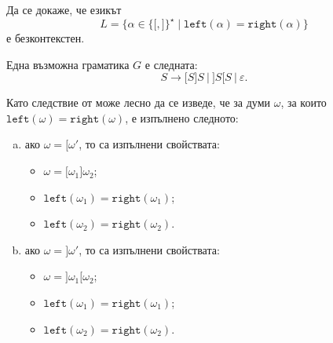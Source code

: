 \begin{framed}
  \begin{problem}
    Да се докаже, че езикът 
    \[L = \{\alpha \in \{\texttt{[}, \texttt{]}\}^\star\mid \texttt{left}(\alpha) = \texttt{right}(\alpha)\}\]
    е безконтекстен.
  \end{problem}  
\end{framed}
\begin{hint}
  \marginpar{  Алтернативна граматика за езика $L$ е
    \[S \to \varepsilon\ |\ \texttt{[}S\texttt{]}\ |\ \texttt{]}S\texttt{[}\ |\ SS.\]}
  Една възможна граматика $G$ е следната: 
  \[S \to \texttt{[}S\texttt{]}S\ |\ \texttt{]}S\texttt{[}S\ |\ \varepsilon.\]
  
  Като следствие от  може лесно да се изведе, че за думи $\omega$, за които $\texttt{left}(\omega) = \texttt{right}(\omega)$,
  е изпълнено следното:
  \begin{enumerate}[a)]
  \item 
    ако $\omega = \texttt{[}\omega'$, то са изпълнени свойствата:
    \begin{itemize}
    \item 
      $\omega = \texttt{[}\omega_1\texttt{]}\omega_2$;
    \item
      $\texttt{left}(\omega_1) = \texttt{right}(\omega_1)$;
    \item
      $\texttt{left}(\omega_2) = \texttt{right}(\omega_2)$.
    \end{itemize}
  \item
    ако $\omega = \texttt{]}\omega'$, то са изпълнени свойствата:
    \begin{itemize}
    \item 
      $\omega = \texttt{]}\omega_1\texttt{[}\omega_2$;
    \item
      $\texttt{left}(\omega_1) = \texttt{right}(\omega_1)$;
    \item
      $\texttt{left}(\omega_2) = \texttt{right}(\omega_2)$.
    \end{itemize}
  \end{enumerate}


\end{hint}

